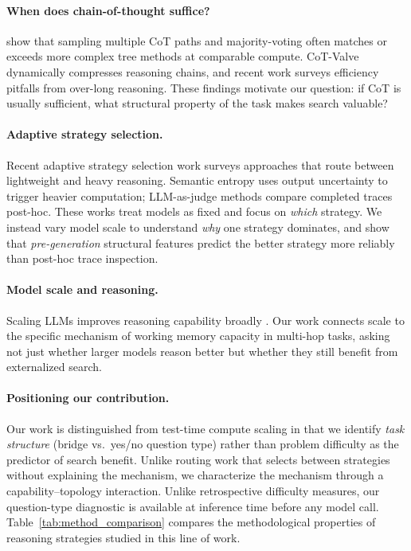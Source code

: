 \documentclass{article}
\begin{document}
\paragraph{When does chain-of-thought suffice?}
\citet{wang2023selfconsistencyimproveschainthought} show that sampling multiple CoT paths and majority-voting often matches or exceeds more complex tree methods at comparable compute. CoT-Valve \citep{ma2025cotvalvelengthcompressiblechainofthoughttuning} dynamically compresses reasoning chains, and recent work \citep{sui2025stopoverthinkingsurveyefficient} surveys efficiency pitfalls from over-long reasoning. These findings motivate our question: if CoT is usually sufficient, what structural property of the task makes search valuable?

\paragraph{Adaptive strategy selection.}
Recent adaptive strategy selection work \citep{sui2025stopoverthinkingsurveyefficient} surveys approaches that route between lightweight and heavy reasoning. Semantic entropy \citep{kossen2024semanticentropyprobesrobust} uses output uncertainty to trigger heavier computation; LLM-as-judge methods \citep{zheng2023judgingllmasajudgemtbenchchatbot} compare completed traces post-hoc. These works treat models as fixed and focus on \emph{which} strategy. We instead vary model scale to understand \emph{why} one strategy dominates, and show that \emph{pre-generation} structural features predict the better strategy more reliably than post-hoc trace inspection.

\paragraph{Model scale and reasoning.}
Scaling LLMs improves reasoning capability broadly \citep{wei2023chainofthoughtpromptingelicitsreasoning}. Our work connects scale to the specific mechanism of working memory capacity in multi-hop tasks, asking not just whether larger models reason better but whether they still benefit from externalized search.

\paragraph{Positioning our contribution.}
Our work is distinguished from test-time compute scaling \citep{snell2024scalingllmtesttimecompute} in that we identify \emph{task structure} (bridge vs.\ yes/no question type) rather than problem difficulty as the predictor of search benefit. Unlike routing work that selects between strategies without explaining the mechanism, we characterize the mechanism through a capability--topology interaction. Unlike retrospective difficulty measures, our question-type diagnostic is available at inference time before any model call. Table~\ref{tab:method_comparison} compares the methodological properties of reasoning strategies studied in this line of work.
\end{document}
